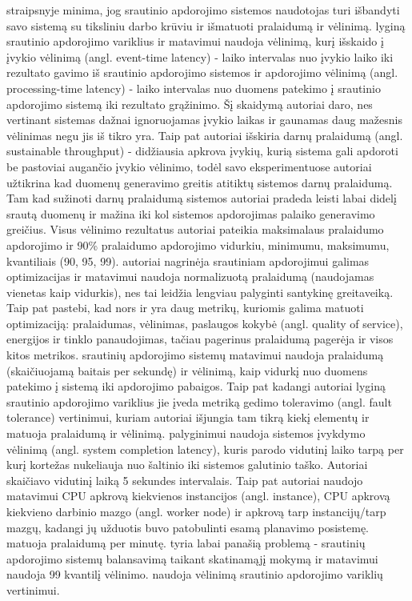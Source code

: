 \documentclass{VUMIFPSbakalaurinis}
\begin{document}
\cite{stonebraker20058} straipsnyje minima, jog srautinio apdorojimo sistemos naudotojas turi išbandyti savo sistemą su tiksliniu darbo krūviu ir išmatuoti pralaidumą ir vėlinimą. \cite{Karimov2018BenchmarkingDS} lyginą srautinio apdorojimo variklius ir matavimui naudoja vėlinimą, kurį išskaido į įvykio vėlinimą (angl. event-time latency) - laiko intervalas nuo įvykio laiko iki rezultato gavimo iš srautinio apdorojimo sistemos ir apdorojimo vėlinimą (angl. processing-time latency) - laiko intervalas nuo duomens patekimo į srautinio apdorojimo sistemą iki rezultato grąžinimo. Šį skaidymą autoriai daro, nes vertinant sistemas dažnai ignoruojamas įvykio laikas ir gaunamas daug mažesnis vėlinimas negu jis iš tikro yra. Taip pat autoriai išskiria darnų pralaidumą (angl. sustainable throughput) - didžiausia apkrova įvykių, kurią sistema gali apdoroti be pastoviai augančio įvykio vėlinimo, todėl savo eksperimentuose autoriai užtikrina kad duomenų generavimo greitis atitiktų sistemos darnų pralaidumą. Tam kad sužinoti darnų pralaidumą sistemos autoriai pradeda leisti labai didelį srautą duomenų ir mažina iki kol sistemos apdorojimas palaiko generavimo greičius. Visus vėlinimo rezultatus autoriai pateikia maksimalaus pralaidumo apdorojimo ir 90\% pralaidumo apdorojimo vidurkiu, minimumu, maksimumu, kvantiliais (90, 95, 99). \cite{hirzel2014catalog} autoriai nagrinėja srautiniam apdorojimui galimas optimizacijas ir matavimui naudoja normalizuotą pralaidumą (naudojamas vienetas kaip vidurkis), nes tai leidžia lengviau palyginti santykinę greitaveiką. Taip pat \cite{hirzel2014catalog} pastebi, kad nors ir yra daug metrikų, kuriomis galima matuoti optimizaciją: pralaidumas, vėlinimas, paslaugos kokybė (angl. quality of service), energijos ir tinklo panaudojimas, tačiau pagerinus pralaidumą pagerėja ir visos kitos metrikos. \cite{Qian2016Benchmarking} srautinių apdorojimo sistemų matavimui naudoja pralaidumą (skaičiuojamą baitais per sekundę) ir vėlinimą, kaip vidurkį nuo duomens patekimo į sistemą iki apdorojimo pabaigos. Taip pat kadangi autoriai lyginą srautinio apdorojimo variklius jie įveda metriką gedimo toleravimo (angl. fault tolerance) vertinimui, kuriam autoriai išjungia tam tikrą kiekį elementų ir matuoja pralaidumą ir vėlinimą. \cite{zhang2020heron} palyginimui naudoja sistemos įvykdymo vėlinimą (angl. system completion latency), kuris parodo vidutinį laiko tarpą per kurį kortežas nukeliauja nuo šaltinio iki sistemos galutinio taško. Autoriai skaičiavo vidutinį laiką 5 sekundes intervalais. Taip pat autoriai naudojo matavimui CPU apkrovą kiekvienos instancijos (angl. instance), CPU apkrovą kiekvieno darbinio mazgo (angl. worker node) ir apkrovą tarp instancijų/tarp mazgų, kadangi jų užduotis buvo patobulinti esamą planavimo posistemę.  \cite{dhalion} matuoja pralaidumą per minutę. \cite{vaquero2018autotuning} tyria labai panašią problemą - srautinių apdorojimo sistemų balansavimą taikant skatinamąjį mokymą ir matavimui naudoja 99 kvantilį vėlinimo. \cite{Chintapalli2016Benchmarking} naudoja vėlinimą srautinio apdorojimo variklių vertinimui.
\end{document}
